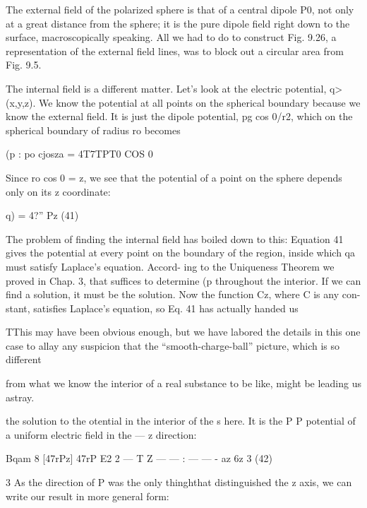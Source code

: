 The external field of the polarized sphere is that of a central
dipole P0, not only at a great distance from the sphere; it is the pure
dipole field right down to the surface, macroscopically speaking.
All we had to do to construct Fig. 9.26, a representation of the external
field lines, was to block out a circular area from Fig. 9.5.

The internal field is a different matter. Let's look at the electric
potential, q>(x,y,z). We know the potential at all points on the
spherical boundary because we know the external field. It is just
the dipole potential, pg cos 0/r2, which on the spherical boundary of
radius ro becomes

\begin{equation}
\end{equation}
(p : po cjosza = 4T7TPT0 COS 0 

Since ro cos 0 = z, we see that the potential of a point on the sphere
depends only on its z coordinate:

\begin{equation}
\end{equation}
q) = 4?'' Pz (41)

The problem of finding the internal field has boiled down to this:
Equation 41 gives the potential at every point on the boundary of
the region, inside which qa must satisfy Laplace's equation. Accord-
ing to the Uniqueness Theorem we proved in Chap. 3, that suffices
to determine (p throughout the interior. If we can find a solution,
it must be the solution. Now the function Cz, where C is any con-
stant, satisfies Laplace's equation, so Eq. 41 has actually handed us

TThis may have been obvious enough, but we have labored the details in this one
case to allay any suspicion that the ``smooth-charge-ball'' picture, which is so different

from what we know the interior of a real substance to be like, might be leading us
astray.

the solution to the otential in the interior of the s here. It is the
P P
potential of a uniform electric field in the  --- z direction:

\begin{equation}
\end{equation}
Bqam 8 [47rPz] 47rP
E2 2  ---  T Z  ---   ---  :  ---  ---  -
az 6z 3 (42)

3
As the direction of P was the only thinghthat distinguished the z axis,
we can write our result in more general form:

